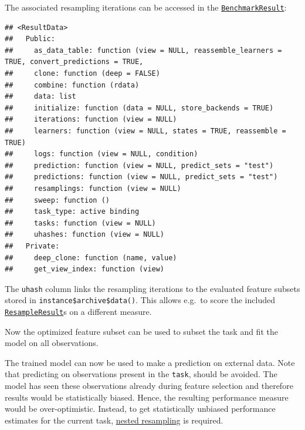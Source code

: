 \documentclass[
]{scrbook}
\newenvironment{Shaded}{\begin{snugshade}}{\end{snugshade}}
\newcommand{\FunctionTok}[1]{\textcolor[rgb]{0.00,0.00,0.00}{#1}}
\newcommand{\NormalTok}[1]{#1}
\newcommand{\SpecialCharTok}[1]{\textcolor[rgb]{0.00,0.00,0.00}{#1}}
\renewenvironment{Shaded} {\begin{snugshade}\small} {\end{snugshade}}
\begin{document}
The associated resampling iterations can be accessed in the \href{https://mlr3.mlr-org.com/reference/BenchmarkResult.html}{\texttt{BenchmarkResult}}:

\begin{Shaded}
\end{Shaded}

\begin{verbatim}
## <ResultData>
##   Public:
##     as_data_table: function (view = NULL, reassemble_learners = TRUE, convert_predictions = TRUE, 
##     clone: function (deep = FALSE) 
##     combine: function (rdata) 
##     data: list
##     initialize: function (data = NULL, store_backends = TRUE) 
##     iterations: function (view = NULL) 
##     learners: function (view = NULL, states = TRUE, reassemble = TRUE) 
##     logs: function (view = NULL, condition) 
##     prediction: function (view = NULL, predict_sets = "test") 
##     predictions: function (view = NULL, predict_sets = "test") 
##     resamplings: function (view = NULL) 
##     sweep: function () 
##     task_type: active binding
##     tasks: function (view = NULL) 
##     uhashes: function (view = NULL) 
##   Private:
##     deep_clone: function (name, value) 
##     get_view_index: function (view)
\end{verbatim}

The \texttt{uhash} column links the resampling iterations to the evaluated feature subsets stored in \texttt{instance\$archive\$data()}. This allows e.g.~to score the included \href{https://mlr3.mlr-org.com/reference/ResampleResult.html}{\texttt{ResampleResult}}s on a different measure.

Now the optimized feature subset can be used to subset the task and fit the model on all observations.

\begin{Shaded}
\end{Shaded}

The trained model can now be used to make a prediction on external data.
Note that predicting on observations present in the \texttt{task}, should be avoided.
The model has seen these observations already during feature selection and therefore results would be statistically biased.
Hence, the resulting performance measure would be over-optimistic.
Instead, to get statistically unbiased performance estimates for the current task, \protect\hyperlink{nested-resampling}{nested resampling} is required.
\end{document}
